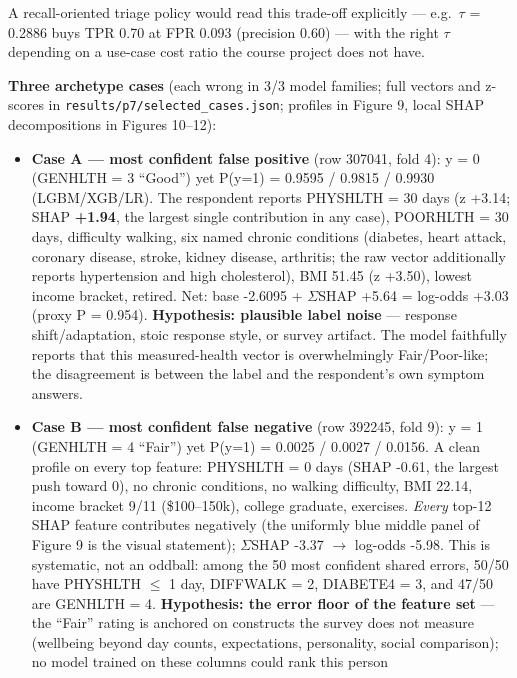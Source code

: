 \documentclass[11pt,a4paper]{article}
\providecommand{\tightlist}{\setlength{\itemsep}{2pt}\setlength{\parskip}{0pt}}
\begin{document}
A recall-oriented triage policy would read this trade-off explicitly ---
e.g.~$\tau$ = 0.2886 buys TPR 0.70 at FPR 0.093 (precision 0.60) --- with the
right $\tau$ depending on a use-case cost ratio the course project does not
have.

\textbf{Three archetype cases} (each wrong in 3/3 model families; full
vectors and z-scores in \texttt{results/p7/selected\_cases.json};
profiles in Figure 9, local SHAP decompositions in Figures 10--12):

\begin{itemize}
\tightlist
\item
  \textbf{Case A --- most confident false positive} (row 307041, fold
  4): y = 0 (GENHLTH = 3 ``Good'') yet P(y=1) = 0.9595 / 0.9815 / 0.9930
  (LGBM/XGB/LR). The respondent reports PHYSHLTH = 30 days (z +3.14;
  SHAP \textbf{+1.94}, the largest single contribution in any case),
  POORHLTH = 30 days, difficulty walking, six named chronic conditions
  (diabetes, heart attack, coronary disease, stroke, kidney disease,
  arthritis; the raw vector additionally reports hypertension and high
  cholesterol), BMI 51.45 (z +3.50), lowest income bracket, retired.
  Net: base -2.6095 + $\Sigma$SHAP +5.64 = log-odds +3.03 (proxy P = 0.954).
  \textbf{Hypothesis: plausible label noise} --- response
  shift/adaptation, stoic response style, or survey artifact. The model
  faithfully reports that this measured-health vector is overwhelmingly
  Fair/Poor-like; the disagreement is between the label and the
  respondent's own symptom answers.
\item
  \textbf{Case B --- most confident false negative} (row 392245, fold
  9): y = 1 (GENHLTH = 4 ``Fair'') yet P(y=1) = 0.0025 / 0.0027 /
  0.0156. A clean profile on every top feature: PHYSHLTH = 0 days (SHAP
  -0.61, the largest push toward 0), no chronic conditions, no walking
  difficulty, BMI 22.14, income bracket 9/11 (\$100--150k), college
  graduate, exercises. \emph{Every} top-12 SHAP feature contributes
  negatively (the uniformly blue middle panel of Figure 9 is the visual
  statement); $\Sigma$SHAP -3.37 $\rightarrow$ log-odds -5.98. This is systematic, not an
  oddball: among the 50 most confident shared errors, 50/50 have
  PHYSHLTH $\le$ 1 day, DIFFWALK = 2, DIABETE4 = 3, and 47/50 are GENHLTH =
  4. \textbf{Hypothesis: the error floor of the feature set} --- the
  ``Fair'' rating is anchored on constructs the survey does not measure
  (wellbeing beyond day counts, expectations, personality, social
  comparison); no model trained on these columns could rank this person

\end{itemize}
\end{document}
